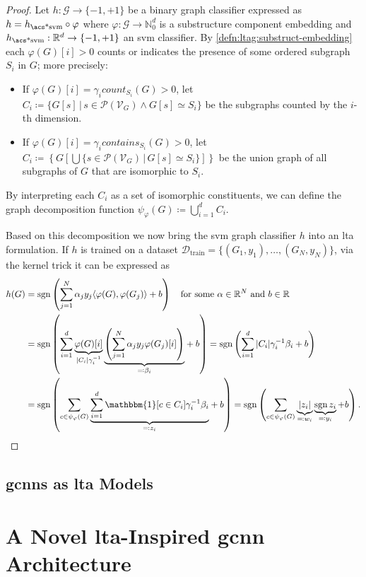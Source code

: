 \begin{proof}
	Let $h: \mathcal{G} \to {\{ -1, +1 \}}$ be a binary graph classifier expressed as $h = h_{\text{\acs*{svm}}} \circ \varphi$ where $\varphi: \mathcal{G} \to \mathbb{N}_0^{d}$ is a substructure component embedding and $h_{\text{\acs*{svm}}}: \mathbb{R}^{d} \to {\{ -1, +1 \}}$ an \ac{svm} classifier.
	By \cref{defn:ltag:substruct-embedding} each $\varphi(G)[i] > 0$ counts or indicates the presence of some ordered subgraph $S_i$ in $G$;
	more precisely:
	\begin{itemize}
		\item If $\varphi(G)[i] = \gamma_i \mathit{count}_{S_i}(G) > 0$, let $C_i \coloneqq {\{ G[s]\, |\, s \in \mathcal{P}(\mathcal{V}_G) \land G[s] \simeq S_i \}}$ be the subgraphs counted by the $i$-th dimension.
		\item If $\varphi(G)[i] = \gamma_i \mathit{contains}_{S_i}(G) > 0$, let $C_i \coloneqq {\left\{ G\left[ \bigcup \{ s \in \mathcal{P}(\mathcal{V}_G)\, |\, G[s] \simeq S_i \} \right] \right\}}$ be the union graph of all subgraphs of $G$ that are isomorphic to $S_i$.
	\end{itemize}
	By interpreting each $C_i$ as a set of isomorphic constituents, we can define the graph decomposition function $\psi_{\varphi}(G) \coloneqq \bigcup_{i=1}^{d} C_i$.

	Based on this decomposition we now bring the \ac{svm} graph classifier $h$ into an \ac{lta} formulation.
	If $h$ is trained on a dataset $\mathcal{D}_{\text{train}} = {\{ (G_1, y_1), \dots, (G_N, y_N) \}}$, via the kernel trick it can be expressed as
	{\allowdisplaybreaks\begin{align*}
		h(G) &= \sgn\left( \sum_{j = 1}^{N} \alpha_j y_j {\langle \varphi(G), \varphi(G_j) \rangle} + b \right)
		\quad\text{for some $\alpha \in \mathbb{R}^N$ and $b \in \mathbb{R}$} \\
		&= \sgn\left( {\sum_{i=1}^{d} {
				\underbrace{\varphi(G)[i]}_{{|C_i|} \gamma_i^{-1}}
				\underbrace{\left( \sum_{j = 1}^{N} \alpha_j y_j {\varphi(G_j)}[i] \right)}_{{} \eqqcolon \beta_i}}
			} + b \right)
		 = \sgn\left( {\sum_{i=1}^{d} {{|C_i|} \gamma_i^{-1} \beta_i}} + b \right) \\
		&= \sgn\left( {\sum_{c \in \psi_{\varphi}(G)} \underbrace{\sum_{i = 1}^d \mathbbm{1}[c \in C_i] \gamma_i^{-1} \beta_i}_{{} \eqqcolon z_i}} + b \right)
		 = \sgn\left( {\sum_{c \in \psi_{\varphi}(G)}} \underbrace{|z_i|}_{{} \eqqcolon w_i} \underbrace{\sgn{z_i}}_{\eqqcolon y_i} + b \right)
		\text{.}
	\end{align*}}
\end{proof}

\subsection{\acsp*{gcnn} as \acs*{lta} Models}%
\label{sec:ltag:formulation:gcnn}

\section{A Novel \acs*{lta}-Inspired \acs*{gcnn} Architecture}%
\label{sec:ltag:wl2gnn}
